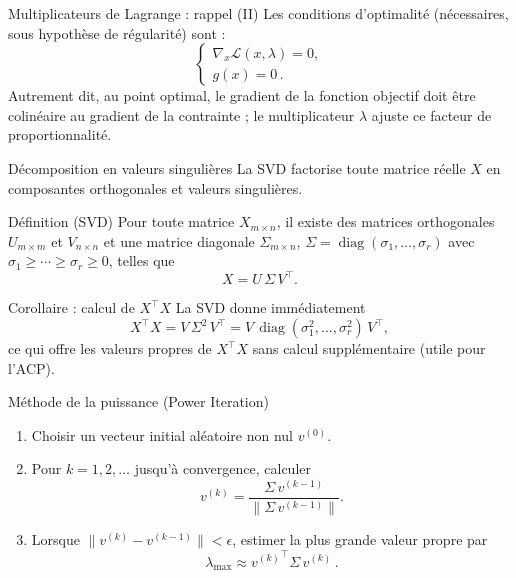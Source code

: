 \documentclass{beamer}
\begin{document}
\begin{frame}{Multiplicateurs de Lagrange : rappel (II)}
Les conditions d'optimalité (nécessaires, sous hypothèse de régularité) sont :
\[
    \begin{cases}
        \nabla_x \mathcal{L}(x,\lambda) = 0,  \\
        g(x) = 0\,.
    \end{cases}
\]
Autrement dit, au point optimal, le gradient de la fonction objectif doit être colinéaire au gradient de la contrainte ; le multiplicateur $\lambda$ ajuste ce facteur de proportionnalité.
\end{frame}

\begin{frame}{D\'ecomposition en valeurs singuli\`eres}
La SVD factorise toute matrice r\'eelle $X$ en composantes orthogonales et valeurs singuli\`eres.

\begin{block}{D\'efinition (SVD)}
Pour toute matrice $X_{m\times n}$, il existe des matrices orthogonales $U_{m\times m}$ et $V_{n\times n}$ et une matrice diagonale $\Sigma_{m\times n}$, $\Sigma=\operatorname{diag}(\sigma_1,\ldots,\sigma_r)$ avec $\sigma_1\ge\cdots\ge\sigma_r\ge0$, telles que
\[
X = U\,\Sigma\,V^{\top}.
\]
\end{block}

\begin{alertblock}{Corollaire : calcul de $X^{\top}X$}
La SVD donne imm\'ediatement
\[
X^{\top}X = V\,\Sigma^{2}\,V^{\top} = 
V\,\operatorname{diag}(\sigma_1^{2},\ldots,\sigma_r^{2})\,V^{\top},
\]
ce qui offre les valeurs propres de $X^{\top}X$ sans calcul suppl\'ementaire (utile pour l'ACP).
\end{alertblock}
\end{frame}

\begin{frame}{Méthode de la puissance (Power Iteration)}
\small
\begin{enumerate}
    \item Choisir un vecteur initial aléatoire non nul $v^{(0)}$.
    \item Pour $k = 1,2,\ldots$ jusqu'à convergence, calculer 
    \[
        v^{(k)} = \frac{\Sigma\, v^{(k-1)}}{\|\Sigma\, v^{(k-1)}\|}.
    \]
    \item Lorsque $\|v^{(k)} - v^{(k-1)}\| < \epsilon$, estimer la plus grande valeur propre par 
    \[
        \lambda_{\max} \approx {v^{(k)}}^\top \Sigma\, v^{(k)}\,.
    \]
\end{enumerate}
\end{frame}
\end{document}
